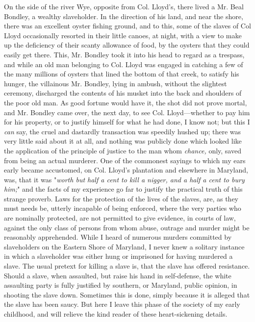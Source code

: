 On the side of the river Wye, opposite from Col. Lloyd's, there lived a
Mr. Beal Bondley, a wealthy slaveholder. In the direction of his land,
and near the shore, there was an excellent oyster fishing ground, and to
this, some of the slaves of Col Lloyd occasionally resorted in their
little canoes, at night, with a view to make up the deficiency of their
scanty allowance of food, by the oysters that they could easily get
there. This, Mr. Bondley took it into his head to regard as a trespass,
and while an old man belonging to Col. Lloyd was engaged in catching a
few of the many millions of oysters that lined the bottom of that creek,
to satisfy his hunger, the villainous Mr. Bondley, lying in ambush,
without the slightest ceremony,
{\protect\hypertarget{127}{}{}}discharged the contents of his musket
into the back and shoulders of the poor old man. As good fortune would
have it, the shot did not prove mortal, and Mr. Bondley came over, the
next day, to see Col. Lloyd---whether to pay him for his property, or to
justify himself for what he had done, I know not; but this I \emph{can}
say, the cruel and dastardly transaction was speedily hushed up; there
was very little said about it at all, and nothing was publicly done
which looked like the application of the principle of justice to the man
whom \emph{chance,} only, saved from being an actual murderer. One of
the commonest sayings to which my ears early became accustomed, on Col.
Lloyd's plantation and elsewhere in Maryland, was, that it was
"\emph{worth but half a cent to kill a nigger, and a half a cent to bury
him;}" and the facts of my experience go far to justify the practical
truth of this strange proverb. Laws for the protection of the lives of
the slaves, are, as they must needs be, utterly incapable of being
enforced, where the very parties who are nominally protected, are not
permitted to give evidence, in courts of law, against the only class of
persons from whom abuse, outrage and murder might be reasonably
apprehended. While I heard of numerous murders committed by slaveholders
on the Eastern Shore of Maryland, I never knew a solitary instance in
which a slaveholder was either hung or imprisoned for having murdered a
slave. The usual pretext for killing a slave is, that the slave has
offered resistance. Should a slave, when assaulted, but raise his hand
in self-defense, the white assaulting party is fully justified by
southern, or Maryland, public opinion, in shooting the slave
{\protect\hypertarget{128}{}{}}down. Sometimes this is done, simply
because it is alleged that the slave has been saucy. But here I leave
this phase of the society of my early childhood, and will relieve the
kind reader of these heart-sickening details.
